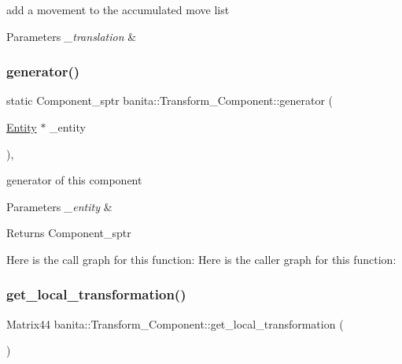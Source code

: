 add a movement to the accumulated move list 


\begin{DoxyParams}{Parameters}
{\em \+\_\+translation} & \\
\hline
\end{DoxyParams}
\mbox{\label{classbanita_1_1_transform___component_a52942de64acefae0655fb17a71add8f3}} 
\subsubsection{\texorpdfstring{generator()}{generator()}}
{\footnotesize\ttfamily static Component\+\_\+sptr banita\+::\+Transform\+\_\+\+Component\+::generator (\begin{DoxyParamCaption}\item[{\mbox{\hyperlink{classbanita_1_1_entity}{Entity}} $\ast$}]{\+\_\+entity }\end{DoxyParamCaption})\hspace{0.3cm}{\ttfamily [inline]}, {\ttfamily [static]}}



generator of this component 


\begin{DoxyParams}{Parameters}
{\em \+\_\+entity} & \\
\hline
\end{DoxyParams}
\begin{DoxyReturn}{Returns}
Component\+\_\+sptr 
\end{DoxyReturn}
Here is the call graph for this function\+:
Here is the caller graph for this function\+:
\mbox{\label{classbanita_1_1_transform___component_a8ffcb477f5e312f75cfb5c9eb9c4ebd1}} 
\subsubsection{\texorpdfstring{get\_local\_transformation()}{get\_local\_transformation()}}
{\footnotesize\ttfamily Matrix44 banita\+::\+Transform\+\_\+\+Component\+::get\+\_\+local\+\_\+transformation (\begin{DoxyParamCaption}{ }\end{DoxyParamCaption})\hspace{0.3cm}{\ttfamily [inline]}}



